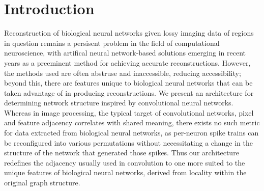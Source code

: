
\chapter{Introduction}

Reconstruction of biological neural networks given lossy imaging data of regions 
in question remains a persisent problem in the field of computational 
neuroscience, with artifical neural network-based solutions emerging in recent 
years as a preeminent method for achieving accurate 
reconstructions.\cite{Ray2015} However, the methods used are often abstruse and 
inaccessible, reducing accessibility; beyond this, there are features unique to 
biological neural networks that can be taken advantage of in producing 
reconstructions. We present an architecture for determining network structure 
inspired by convolutional neural networks. Whereas in image processing, the 
typical target of convolutional networks, pixel and feature adjacency correlates 
with shared meaning, there exists no such metric for data extracted from 
biological neural networks, as per-neuron spike trains can be reconfigured into 
various permutations without necessitating a change in the structure of the 
network that generated those spikes. Thus our architecture redefines the 
adjacency usually used in convolution to one more suited to the unique features 
of biological neural networks, derived from locality within the original graph 
structure.
